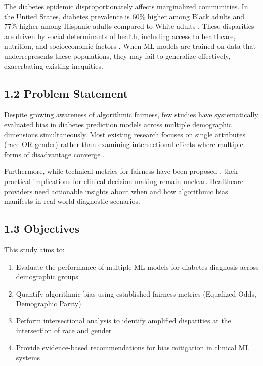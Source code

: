 \documentclass[12pt,a4paper]{article}
\begin{document}
The diabetes epidemic disproportionately affects marginalized communities. 
In the United States, diabetes prevalence is 60\% higher among Black adults 
and 77\% higher among Hispanic adults compared to White adults \cite{cdc2020}. 
These disparities are driven by social determinants of health, including 
access to healthcare, nutrition, and socioeconomic factors \cite{hill2022}. 
When ML models are trained on data that underrepresents these populations, 
they may fail to generalize effectively, exacerbating existing inequities.

\subsection{1.2 Problem Statement}

Despite growing awareness of algorithmic fairness, few studies have systematically 
evaluated bias in diabetes prediction models across multiple demographic 
dimensions simultaneously. Most existing research focuses on single attributes 
(race OR gender) rather than examining intersectional effects where multiple 
forms of disadvantage converge \cite{crenshaw1989}.

Furthermore, while technical metrics for fairness have been proposed 
\cite{corbett2018}, their practical implications for clinical decision-making 
remain unclear. Healthcare providers need actionable insights about when and 
how algorithmic bias manifests in real-world diagnostic scenarios.

\subsection{1.3 Objectives}

This study aims to:

\begin{enumerate}
    \item Evaluate the performance of multiple ML models for diabetes diagnosis 
          across demographic groups
    \item Quantify algorithmic bias using established fairness metrics 
          (Equalized Odds, Demographic Parity)
    \item Perform intersectional analysis to identify amplified disparities 
          at the intersection of race and gender
    \item Provide evidence-based recommendations for bias mitigation in 
          clinical ML systems
\end{enumerate}
\end{document}

